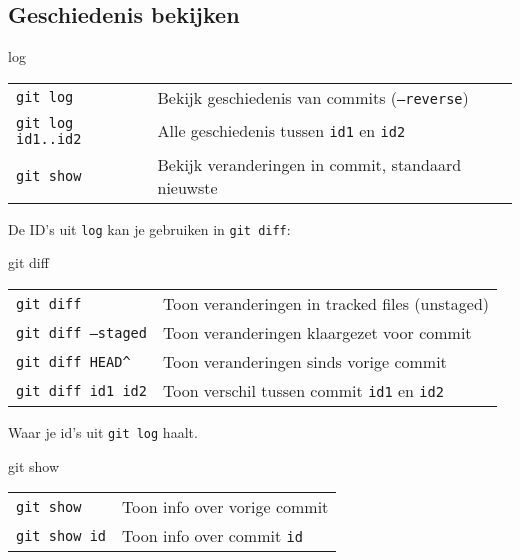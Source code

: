 \subsection{Geschiedenis bekijken}
\begin{frame}{log}
	\begin{tabular}{ll}
		\texttt{git log}& Bekijk geschiedenis van commits (\texttt{--reverse})\\
		\texttt{git log id1..id2} & Alle geschiedenis tussen \texttt{id1} en \texttt{id2}\\
		\texttt{git show}& Bekijk veranderingen in commit, standaard nieuwste
	\end{tabular}

	De ID's uit \texttt{log} kan je gebruiken in \texttt{git diff}:
\end{frame}

\begin{frame}{git diff}
	\begin{tabular}{ll}
		\texttt{git diff}&Toon veranderingen in tracked files (unstaged)\\
		\texttt{git diff --staged}&Toon veranderingen klaargezet voor commit\\
		\texttt{git diff HEAD\^}&Toon veranderingen sinds vorige commit\\
		\texttt{git diff id1 id2}&Toon verschil tussen commit \texttt{id1} en \texttt{id2}
	\end{tabular}
	{\footnotesize Waar je id's uit \texttt{git log} haalt. }
\end{frame}

\begin{frame}{git show}
	\begin{tabular}{l l}
		\texttt{git show}&Toon info over vorige commit\\
		\texttt{git show id}&Toon info over commit \texttt{id}\\
	\end{tabular}
\end{frame}

